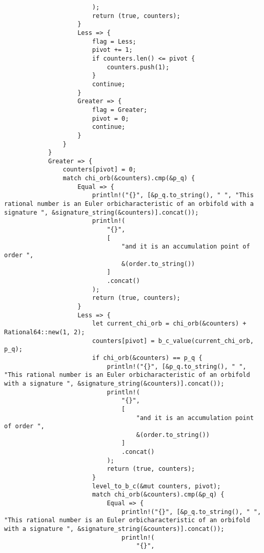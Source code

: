 \begin{lstlisting}
                        );
                        return (true, counters);
                    }
                    Less => {
                        flag = Less;
                        pivot += 1;
                        if counters.len() <= pivot {
                            counters.push(1);
                        }
                        continue;
                    }
                    Greater => {
                        flag = Greater;
                        pivot = 0;
                        continue;
                    }
                }
            }
            Greater => {
                counters[pivot] = 0;
                match chi_orb(&counters).cmp(&p_q) {
                    Equal => {
                        println!("{}", [&p_q.to_string(), " ", "This rational number is an Euler orbicharacteristic of an orbifold with a signature ", &signature_string(&counters)].concat());
                        println!(
                            "{}",
                            [
                                "and it is an accumulation point of order ",
                                &(order.to_string())
                            ]
                            .concat()
                        );
                        return (true, counters);
                    }
                    Less => {
                        let current_chi_orb = chi_orb(&counters) + Rational64::new(1, 2);
                        counters[pivot] = b_c_value(current_chi_orb, p_q);
                        if chi_orb(&counters) == p_q {
                            println!("{}", [&p_q.to_string(), " ", "This rational number is an Euler orbicharacteristic of an orbifold with a signature ", &signature_string(&counters)].concat());
                            println!(
                                "{}",
                                [
                                    "and it is an accumulation point of order ",
                                    &(order.to_string())
                                ]
                                .concat()
                            );
                            return (true, counters);
                        }
                        level_to_b_c(&mut counters, pivot);
                        match chi_orb(&counters).cmp(&p_q) {
                            Equal => {
                                println!("{}", [&p_q.to_string(), " ", "This rational number is an Euler orbicharacteristic of an orbifold with a signature ", &signature_string(&counters)].concat());
                                println!(
                                    "{}",

\end{lstlisting}
